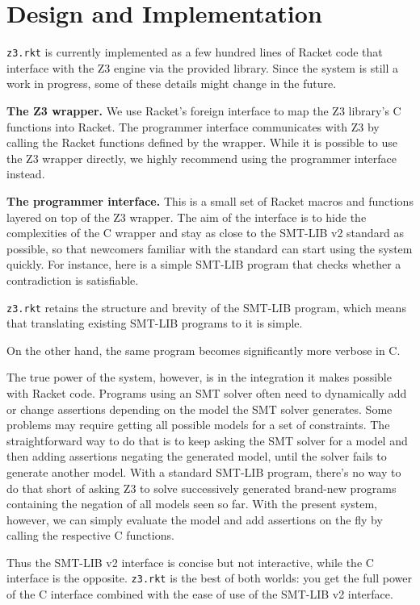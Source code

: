 \section{Design and Implementation}

\texttt{z3.rkt} is currently implemented as a few hundred lines of Racket code
that interface with the Z3 engine via the provided library. Since the system is
still a work in progress, some of these details might change in the future.

\textbf{The Z3 wrapper.} We use Racket's foreign interface \cite{racket/foreign}
to map the Z3 library's C functions into Racket. The programmer interface
communicates with Z3 by calling the Racket functions defined by the
wrapper. While it is possible to use the Z3 wrapper directly, we highly
recommend using the programmer interface instead.

\textbf{The programmer interface.} This is a small set of Racket macros and
functions layered on top of the Z3 wrapper. The aim of the interface is to hide
the complexities of the C wrapper and stay as close to the SMT-LIB v2 standard
\cite{smtlib2:10} as possible, so that newcomers familiar with the standard can
start using the system quickly. For instance, here is a simple SMT-LIB program
that checks whether a contradiction is satisfiable.



\texttt{z3.rkt} retains the structure and brevity of the SMT-LIB program, which
means that translating existing SMT-LIB programs to it is simple.



On the other hand, the same program becomes significantly more verbose in C.

The true power of the system, however, is in the integration it makes possible
with Racket code. Programs using an SMT solver often need to dynamically add or
change assertions depending on the model the SMT solver generates. Some problems
may require getting all possible models for a set of constraints. The
straightforward way to do that is to keep asking the SMT solver for a model and
then adding assertions negating the generated model, until the solver fails to
generate another model. With a standard SMT-LIB program, there's no way to do
that short of asking Z3 to solve successively generated brand-new programs
containing the negation of all models seen so far. With the present system,
however, we can simply evaluate the model and add assertions on the fly by
calling the respective C functions.

Thus the SMT-LIB v2 interface is concise but not interactive, while the C
interface is the opposite. \texttt{z3.rkt} is the best of both worlds: you get
the full power of the C interface combined with the ease of use of the SMT-LIB
v2 interface.
